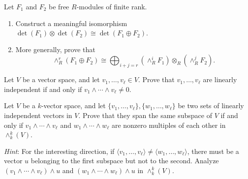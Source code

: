 \documentclass[openany]{book}
\newcommand{\tensor}{\otimes} %
\newcommand{\lambdaprod}{\wedge} %
\begin{document}
    \begin{prob}[4.4]
    Let \(F_1\) and \(F_2\) be free \(R\)-modules of finite rank.
    \begin{enumerate}
        \item Construct a meaningful isomorphism \(\det(F_1) \tensor \det(F_2) \cong \det(F_1 \oplus F_2)\).
        \item More generally, prove that
        \[
        \lambdaprod^r_R(F_1 \oplus F_2) \cong \bigoplus_{i+j=r} (\lambdaprod^i_R F_1) \tensor_R (\lambdaprod^j_R F_2).
        \]
    \end{enumerate}
    \end{prob}
    
    
    
    \begin{prob}[4.6]
    Let \(V\) be a vector space, and let \(v_1, \ldots, v_\ell \in V\). Prove that \(v_1, \ldots, v_\ell\) are linearly independent if and only if \(v_1 \lambdaprod \cdots \lambdaprod v_\ell \neq 0\).
    \end{prob}

    
    \begin{prob}[4.7]
    Let \(V\) be a \(k\)-vector space, and let \(\{v_1, \ldots, v_\ell\}, \{w_1, \ldots, w_\ell\}\) be two sets of linearly independent vectors in \(V\). Prove that they span the same subspace of \(V\) if and only if \(v_1 \lambdaprod \cdots \lambdaprod v_\ell\) and \(w_1 \lambdaprod \cdots \lambdaprod w_\ell\) are nonzero multiples of each other in \(\lambdaprod^k_k(V)\). 
    
    \textit{Hint}: For the interesting direction, if \(\langle v_1, \ldots, v_\ell \rangle \neq \langle w_1, \ldots, w_\ell \rangle\), there must be a vector \(u\) belonging to the first subspace but not to the second. Analyze \((v_1 \lambdaprod \cdots \lambdaprod v_\ell) \lambdaprod u\) and \((w_1 \lambdaprod \cdots \lambdaprod w_\ell) \lambdaprod u\) in \(\lambdaprod^k_k(V)\). 
    \end{prob}
    
\end{document}
